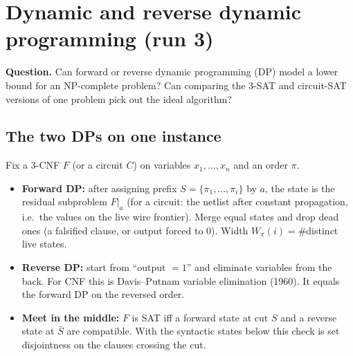 \documentclass[11pt]{article}
\begin{document}
\section{Dynamic and reverse dynamic programming (run 3)}
\label{sec:dp}
\textbf{Question.} Can forward or reverse dynamic programming (DP) model a lower bound
for an NP-complete problem? Can comparing the 3-SAT and circuit-SAT versions of one
problem pick out the ideal algorithm?

\subsection{The two DPs on one instance}
Fix a 3-CNF $F$ (or a circuit $C$) on variables $x_1,\dots,x_n$ and an order $\pi$.
\begin{itemize}
\item \textbf{Forward DP:} after assigning prefix $S=\{\pi_1,\dots,\pi_i\}$ by $a$,
the state is the residual subproblem $F|_a$ (for a circuit: the netlist after constant
propagation, i.e.\ the values on the live wire frontier). Merge equal states and drop dead ones
(a falsified clause, or output forced to $0$). Width $W_\pi(i)=\#$distinct live states.
\item \textbf{Reverse DP:} start from ``output $=1$'' and eliminate variables from the back.
For CNF this is Davis--Putnam variable elimination (1960). It equals the forward DP on the reversed order.
\item \textbf{Meet in the middle:} $F$ is SAT iff a forward state at cut $S$ and a reverse
state at $\bar S$ are compatible. With the syntactic states below this check is set
disjointness on the clauses crossing the cut.
\end{itemize}
\end{document}
